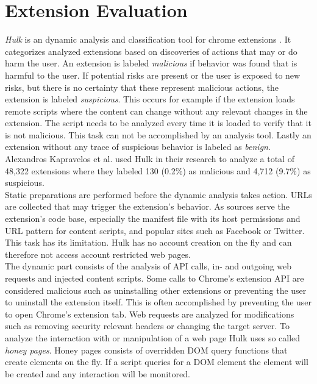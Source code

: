 \section{Extension Evaluation} 
	
	\textit{Hulk} is an dynamic analysis and classification tool for chrome extensions \cite{184485}. It categorizes analyzed extensions based on discoveries of actions that may or do harm the user. An extension is labeled \textit{malicious} if behavior was found that is harmful to the user. If potential risks are present or the user is exposed to new risks, but there is no certainty that these represent malicious actions, the extension is labeled \textit{suspicious}. This occurs for example if the extension loads remote scripts where the content can change without any relevant changes in the extension. The script needs to be analyzed every time it is loaded to verify that it is not malicious. This task can not be accomplished by an analysis tool. Lastly an extension without any trace of suspicious behavior is labeled as \textit{benign}. Alexandros Kapravelos et al. used Hulk in their research to analyze a total of 48,322 extensions where they labeled 130 (0.2\%) as malicious and 4,712 (9.7\%) as suspicious. \\
	Static preparations are performed before the dynamic analysis takes action. URLs are collected that may trigger the extension's behavior. As sources serve the extension's code base, especially the manifest file with its host permissions and URL pattern for content scripts, and popular sites such as Facebook or Twitter. This task has its limitation. Hulk has no account creation on the fly and can therefore not access account restricted web pages. \\
	The dynamic part consists of the analysis of API calls, in- and outgoing web requests and injected content scripts. Some calls to Chrome's extension API are considered malicious such as uninstalling other extensions or preventing the user to uninstall the extension itself. This is often accomplished by preventing the user to open Chrome's extension tab. Web requests are analyzed for modifications such as removing security relevant headers or changing the target server. To analyze the interaction with or manipulation of a web page Hulk uses so called \textit{honey pages}. Honey pages consists of overridden DOM query functions that create elements on the fly. If a script queries for a DOM element the element will be created and any interaction will be monitored. \\
	
